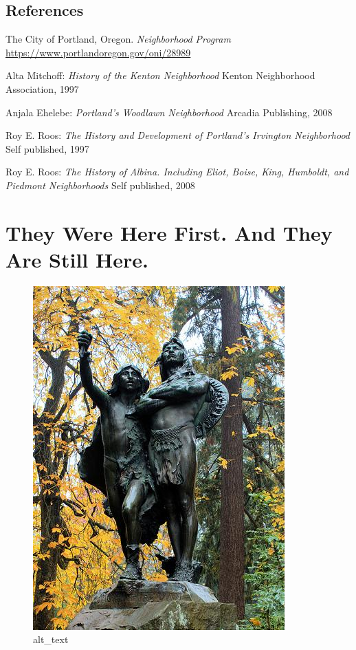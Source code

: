 \documentclass[
  12pt,
]{book}
\begin{document}
\hypertarget{references}{%
\section*{References}\label{references}}

The City of Portland, Oregon. \emph{Neighborhood Program}
\url{https://www.portlandoregon.gov/oni/28989}

Alta Mitchoff: \emph{History of the Kenton Neighborhood}
Kenton Neighborhood Association, 1997

Anjala Ehelebe: \emph{Portland's Woodlawn Neighborhood}
Arcadia Publishing, 2008

Roy E. Roos: \emph{The History and Development of Portland's Irvington Neighborhood}
Self published, 1997

Roy E. Roos: \emph{The History of Albina. Including Eliot, Boise, King, Humboldt, and Piedmont Neighborhoods}
Self published, 2008

\hypertarget{they-were-here-first.-and-they-are-still-here.}{%
\chapter{They Were Here First. And They Are Still Here.}\label{they-were-here-first.-and-they-are-still-here.}}

\begin{figure}
\centering
\includegraphics{images/01_images/image1.jpg}
\caption{alt\_text}
\end{figure}
\end{document}
